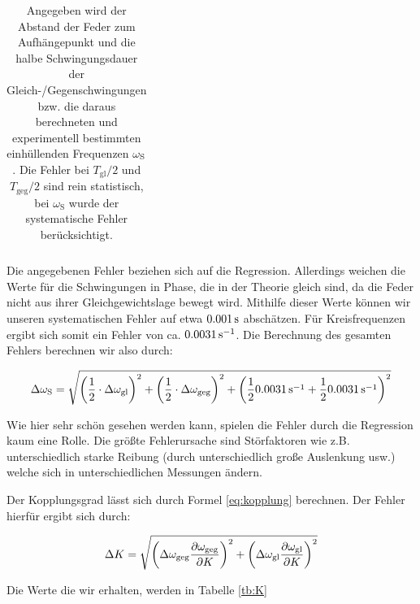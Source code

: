 \begin{table}
{\begin{tabular}{ccccccc}
\end{tabular}
}
\caption{Angegeben wird der Abstand der Feder zum Aufhängepunkt und die halbe Schwingungsdauer der Gleich-/Gegenschwingungen bzw. die daraus berechneten und experimentell bestimmten einhüllenden Frequenzen $\omega_{\mathrm{S}}$. Die Fehler bei $T_\mathrm{gl}/2$ und $T_\mathrm{geg}/2$ sind rein statistisch, bei $\omega_\mathrm{S}$ wurde der systematische Fehler berücksichtigt.}
\label{tb:values}
\end{table}

Die angegebenen Fehler beziehen sich auf die Regression. Allerdings weichen die Werte für die Schwingungen in Phase, die in der Theorie gleich sind, da die Feder nicht aus ihrer Gleichgewichtslage bewegt wird. Mithilfe dieser Werte können wir unseren systematischen Fehler auf etwa $\unit[0.001]{s}$ abschätzen. Für Kreisfrequenzen ergibt sich somit ein Fehler von ca. $\unit[0.0031]{s^{-1}}$. Die Berechnung des gesamten Fehlers berechnen wir also durch:

\begin{equation*}
\Delta \omega_\n{S} = \sqrt{
\left(\frac{1}{2} \cdot \Delta\omega_\n{gl}\right)^2
+ 
\left(\frac{1}{2} \cdot \Delta\omega_\n{geg}\right)^2
+
\left(\frac12 \unit[0.0031]{s^{-1}} + \frac12 \unit[0.0031]{s^{-1}} \right)^2
}
\end{equation*}

Wie hier sehr schön gesehen werden kann, spielen die Fehler durch die Regression kaum eine Rolle. Die größte Fehlerursache sind Störfaktoren wie z.B. unterschiedlich starke Reibung (durch unterschiedlich große Auslenkung usw.) welche sich in unterschiedlichen Messungen ändern.

Der Kopplungsgrad lässt sich durch Formel \ref{eq:kopplung} berechnen. Der Fehler hierfür ergibt sich durch:

\begin{equation*}
\Delta K = \sqrt{
\left(\Delta \omega_{\mathrm{geg}}\frac{\partial \omega_{\mathrm{geg}}}{\partial K}\right)^2
+
\left(\Delta \omega_{\mathrm{gl}}\frac{\partial \omega_{\mathrm{gl}}}{\partial K}\right)^2
}
\end{equation*}

Die Werte die wir erhalten, werden in Tabelle \ref{tb:K}

\begin{table}[t]
\caption{Die berechnetet Werte für den Kopplungsgrad $K$}
\label{tb:K}
\end{table}



